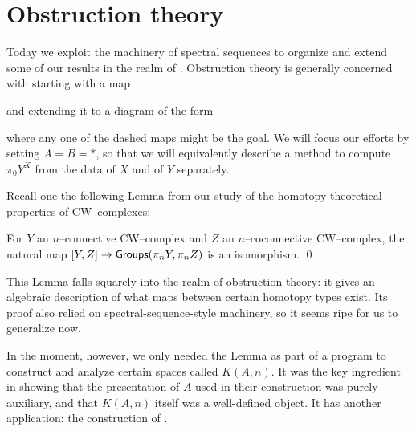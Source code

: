 \section{Obstruction theory}

Today we exploit the machinery of spectral sequences to organize and extend some of our results in the realm of .
Obstruction theory is generally concerned with starting with a map
\begin{center}
\end{center}
and extending it to a diagram of the form
\begin{center}
\end{center}
where any one of the dashed maps might be the goal.
We will focus our efforts by setting $A = B = *$, so that we will equivalently describe a method to compute $\pi_0 Y^X$ from the data of $X$ and of $Y$ separately.

Recall one the following Lemma from our study of the homotopy-theoretical properties of CW--complexes:
\begin{lemma}
For $Y$ an $n$--connective CW--complex and $Z$ an $n$--coconnective CW--complex,
the natural map $[Y, Z] \to \mathsf{Groups}(\pi_n Y, \pi_n Z)$ is an isomorphism. \qed
\end{lemma}

\noindent
This Lemma falls squarely into the realm of obstruction theory: it gives an algebraic description of what maps between certain homotopy types exist.
Its proof also relied on spectral-sequence-style machinery, so it seems ripe for us to generalize now.

In the moment, however, we only needed the Lemma as part of a program to construct and analyze certain spaces called $K(A, n)$.
It was the key ingredient in showing that the presentation of $A$ used in their construction was purely auxiliary, and that $K(A, n)$ itself was a well-defined object.
It has another application: the construction of .

